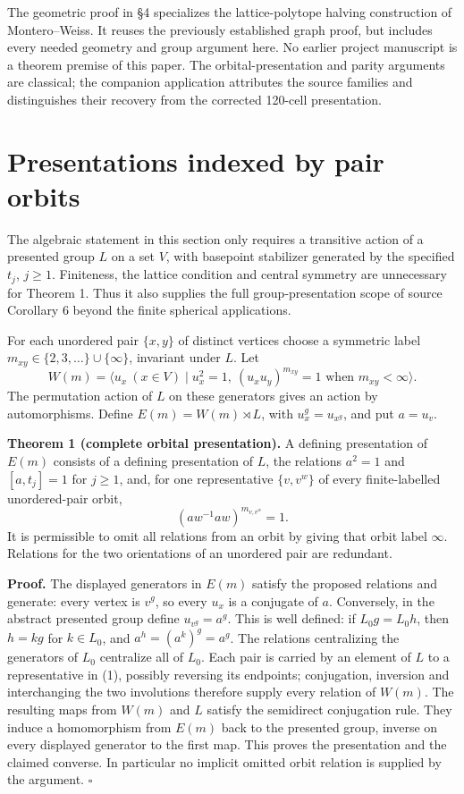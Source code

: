 The geometric proof in \S4 specializes the lattice-polytope halving construction of Montero--Weiss. It reuses the previously established graph proof, but includes every needed geometry and group argument here. No earlier project manuscript is a theorem premise of this paper. The orbital-presentation and parity arguments are classical; the companion application attributes the source families and distinguishes their recovery from the corrected 120-cell presentation.

\section{Presentations indexed by pair orbits}\label{presentations-indexed-by-pair-orbits}

The algebraic statement in this section only requires a transitive action of a presented group \(L\) on a set \(V\), with basepoint stabilizer generated by the specified \(t_j\), \(j\ge1\). Finiteness, the lattice condition and central symmetry are unnecessary for Theorem 1. Thus it also supplies the full group-presentation scope of source Corollary 6 beyond the finite spherical applications.

For each unordered pair \(\{x,y\}\) of distinct vertices choose a symmetric label \(m_{xy}\in\{2,3,\ldots\}\cup\{\infty\}\), invariant under \(L\). Let
\[
 W(m)=\langle u_x\ (x\in V)\mid u_x^2=1,\ (u_xu_y)^{m_{xy}}=1\text{ when }m_{xy}<\infty\rangle.
\]
The permutation action of \(L\) on these generators gives an action by automorphisms. Define \(E(m)=W(m)\rtimes L\), with \(u_x^g=u_{x^g}\), and put \(a=u_v\).

\textbf{Theorem 1 (complete orbital presentation).} A defining presentation of \(E(m)\) consists of a defining presentation of \(L\), the relations \(a^2=1\) and \([a,t_j]=1\) for \(j\ge1\), and, for one representative \(\{v,v^w\}\) of every finite-labelled unordered-pair orbit,
\[
 (a w^{-1}a w)^{m_{v,v^w}}=1.                 \tag{1}
\]
It is permissible to omit all relations from an orbit by giving that orbit label \(\infty\). Relations for the two orientations of an unordered pair are redundant.

\textbf{Proof.} The displayed generators in \(E(m)\) satisfy the proposed relations and generate: every vertex is \(v^g\), so every \(u_x\) is a conjugate of \(a\). Conversely, in the abstract presented group define \(u_{v^g}=a^g\). This is well defined: if \(L_0g=L_0h\), then \(h=kg\) for \(k\in L_0\), and \(a^h=(a^k)^g=a^g\). The relations centralizing the generators of \(L_0\) centralize all of \(L_0\). Each pair is carried by an element of \(L\) to a representative in (1), possibly reversing its endpoints; conjugation, inversion and interchanging the two involutions therefore supply every relation of \(W(m)\). The resulting maps from \(W(m)\) and \(L\) satisfy the semidirect conjugation rule. They induce a homomorphism from \(E(m)\) back to the presented group, inverse on every displayed generator to the first map. This proves the presentation and the claimed converse. In particular no implicit omitted orbit relation is supplied by the argument. $\square$

